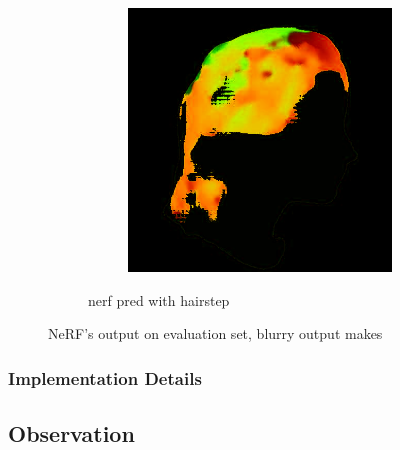 \documentclass[12pt]{article}
\begin{document}
\begin{figure}[h]
\begin{subfigure}{0.48\textwidth}
\begin{subfigure}{0.48\textwidth}
        \end{subfigure}
        \hfill
        \begin{subfigure}{0.48\textwidth}
            \centering
            \includegraphics[width=\textwidth]{./images/pred_6_hairstep.jpg}
        \end{subfigure}
        \caption{nerf pred with hairstep}
    \end{subfigure}

    \caption{NeRF's output on evaluation set, blurry output makes }
    \label{fig:nerf_hairstep}
\end{figure}

\subsubsection{Implementation Details}


\subsection{Observation}



\end{document}
